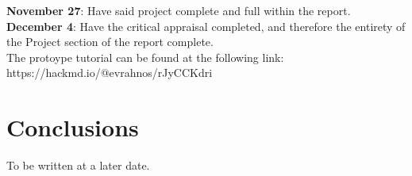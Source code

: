 \documentclass{article}
\theoremstyle{theorem}
\theoremstyle{definition}
\theoremstyle{remark}
\begin{document}
\noindent \textbf{November 27}: Have said project complete and full within the report.\\

\noindent \textbf{December 4}: Have the critical appraisal completed, and therefore the entirety of the Project section of the report complete. \\

\noindent The protoype tutorial can be found at the following link: https://hackmd.io/@evrahnos/rJyCCKdri

\section{Conclusions}\label{conclusions}

To be written at a later date.
\end{document}
